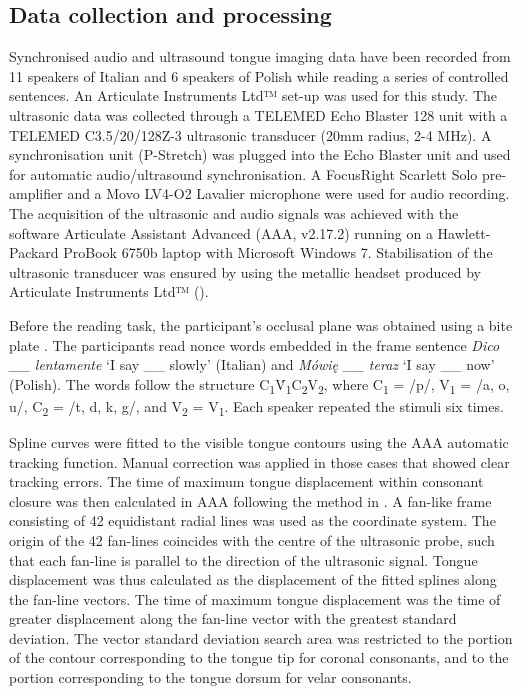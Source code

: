 \documentclass[
  11pt,
]{article}
\begin{document}
\hypertarget{data-collection-and-processing}{%
\subsection{Data collection and
processing}\label{data-collection-and-processing}}

\label{s:data}

Synchronised audio and ultrasound tongue imaging data have been recorded
from 11 speakers of Italian and 6 speakers of Polish while reading a
series of controlled sentences. An Articulate Instruments Ltd™ set-up
was used for this study. The ultrasonic data was collected through a
TELEMED Echo Blaster 128 unit with a TELEMED C3.5/20/128Z-3 ultrasonic
transducer (20mm radius, 2-4 MHz). A synchronisation unit (P-Stretch)
was plugged into the Echo Blaster unit and used for automatic
audio/ultrasound synchronisation. A FocusRight Scarlett Solo
pre-amplifier and a Movo LV4-O2 Lavalier microphone were used for audio
recording. The acquisition of the ultrasonic and audio signals was
achieved with the software Articulate Assistant Advanced (AAA, v2.17.2)
running on a Hawlett-Packard ProBook 6750b laptop with Microsoft Windows
7. Stabilisation of the ultrasonic transducer was ensured by using the
metallic headset produced by Articulate Instruments Ltd™
(\citeyear{articulate2008}).

Before the reading task, the participant's occlusal plane was obtained
using a bite plate \citep{scobbie2011}. The participants read nonce
words embedded in the frame sentence \emph{Dico \_\_ lentamente} `I say
\_\_ slowly' (Italian) and \emph{Mówię \_\_ teraz} `I say \_\_ now'
(Polish). The words follow the structure
C\textsubscript{1}V́\textsubscript{1}C\textsubscript{2}V\textsubscript{2},
where C\textsubscript{1} = /p/, V\textsubscript{1} = /a, o, u/,
C\textsubscript{2} = /t, d, k, g/, and V\textsubscript{2} =
V\textsubscript{1}. Each speaker repeated the stimuli six times.

Spline curves were fitted to the visible tongue contours using the AAA
automatic tracking function. Manual correction was applied in those
cases that showed clear tracking errors. The time of maximum tongue
displacement within consonant closure was then calculated in AAA
following the method in \citet{strycharczuk2015}. A fan-like frame
consisting of 42 equidistant radial lines was used as the coordinate
system. The origin of the 42 fan-lines coincides with the centre of the
ultrasonic probe, such that each fan-line is parallel to the direction
of the ultrasonic signal. Tongue displacement was thus calculated as the
displacement of the fitted splines along the fan-line vectors. The time
of maximum tongue displacement was the time of greater displacement
along the fan-line vector with the greatest standard deviation. The
vector standard deviation search area was restricted to the portion of
the contour corresponding to the tongue tip for coronal consonants, and
to the portion corresponding to the tongue dorsum for velar consonants.
\end{document}
